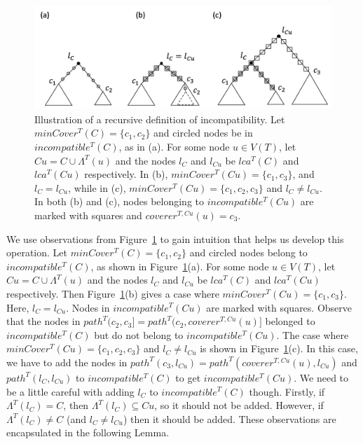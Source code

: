 \documentclass[12pt,a4paper]{article}
\newcommand{\leafset}{\Lambda}
\begin{document}
    \begin{figure}[ht]
        \includegraphics[scale=0.6]{incompatibilityrecursive}
        \centering
        \caption[Recursively defining incompatibility]{Illustration of a recursive definition of incompatibility. Let $minCover^{T}(C) = \{c_1, c_2\}$ and circled nodes be in $incompatible^{T}(C)$, as in (a). For some node $u \in V(T)$, let $Cu = C \cup \leafset^{T}(u)$ and the nodes $l_C$ and $l_{Cu}$ be $lca^{T}(C)$ and $lca^{T}(Cu)$ respectively. In (b), $minCover^{T}(Cu) = \{c_1, c_3\}$, and $l_C = l_{Cu}$, while in (c), $minCover^{T}(Cu) = \{c_1, c_2, c_3\}$ and $l_C \neq l_{Cu}$. In both (b) and (c), nodes belonging to $incompatible^{T}(Cu)$ are marked with squares and $coverer^{T, Cu}(u) = c_3$.}
        \label{fig:incompatibilityrecursive}
    \end{figure}

    We use observations from Figure~\ref{fig:incompatibilityrecursive} to gain intuition that helps us develop this operation. Let $minCover^{T}(C) = \{c_1, c_2\}$ and circled nodes belong to $incompatible^{T}(C)$, as shown in Figure~\ref{fig:incompatibilityrecursive}(a). For some node $u \in V(T)$, let $Cu = C \cup \leafset^{T}(u)$ and the nodes $l_C$ and $l_{Cu}$ be $lca^{T}(C)$ and $lca^{T}(Cu)$ respectively. Then Figure~\ref{fig:incompatibilityrecursive}(b) gives a case where $minCover^{T}(Cu) = \{c_1, c_3\}$. Here, $l_C = l_{Cu}$. Nodes in $incompatible^{T}(Cu)$ are marked with squares. Observe that the nodes in $path^{T}(c_2, c_3] = path^{T}(c_2, coverer^{T, Cu}(u)]$ belonged to $incompatible^{T}(C)$ but do not belong to $incompatible^{T}(Cu)$. The case where $minCover^{T}(Cu) = \{c_1, c_2, c_3\}$ and $l_C \neq l_{Cu}$ is shown in Figure~\ref{fig:incompatibilityrecursive}(c). In this case, we have to add the nodes in $path^{T}(c_3, l_{Cu}) = path^{T}(coverer^{T, Cu}(u), l_{Cu})$ and $path^{T}(l_C, l_{Cu})$ to $incompatible^{T}(C)$ to get $incompatible^{T}(Cu)$. We need to be a little careful with adding $l_C$ to $incompatible^{T}(C)$ though. Firstly, if $\leafset^{T}(l_C) = C$, then $\leafset^{T}(l_C) \subseteq Cu$, so it should not be added. However, if $\leafset^{T}(l_C) \neq C$ (and $l_C \neq l_{Cu}$) then it should be added. These observations are encapsulated in the following Lemma.
    \newline
\end{document}

